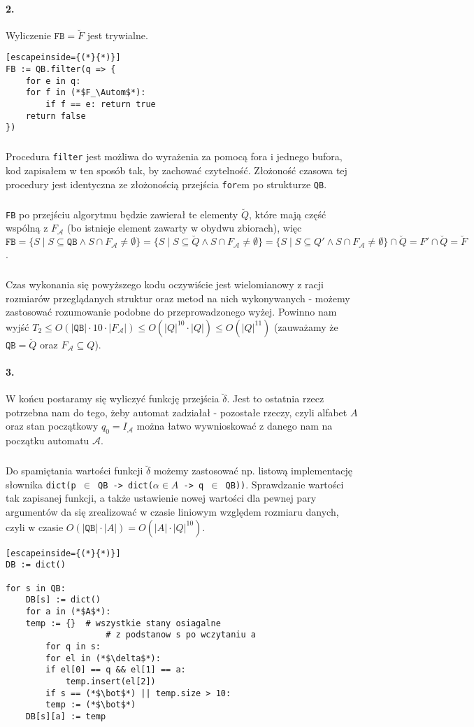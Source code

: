 \documentclass[12pt]{article}
\newcommand*{\Autom}{\mathcal{A}}
\begin{document}
\paragraph{2.}
Wyliczenie $\texttt{FB} = \breve F$ jest trywialne.
\begin{lstlisting}[escapeinside={(*}{*)}]
FB := QB.filter(q => {
    for e in q:
	for f in (*$F_\Autom$*):
	    if f == e: return true
    return false
})
\end{lstlisting}
\subparagraph{}
Procedura \texttt{filter} jest możliwa do wyrażenia za pomocą fora i jednego bufora, kod zapisałem
w ten sposób tak, by zachować czytelność. Złożoność czasowa tej procedury jest identyczna ze
złożonością przejścia \texttt{for}em po strukturze \texttt{QB}.
\subparagraph{}
\texttt{FB} po przejściu algorytmu będzie zawierał te elementy $\breve Q$, które mają część wspólną
z $F_\Autom$ (bo istnieje element zawarty w obydwu zbiorach), więc $\texttt{FB} =
\{S \mid S \subseteq \texttt{QB} \land S \cap F_\Autom \neq \emptyset\} =
\{S \mid S \subseteq \breve Q \land S \cap F_\Autom \neq \emptyset\} =
\{S \mid S \subseteq Q' \land S \cap F_\Autom \neq \emptyset\} \cap \breve Q = F' \cap \breve Q =
\breve F$.
\subparagraph{}
Czas wykonania się powyższego kodu oczywiście jest wielomianowy z racji rozmiarów przeglądanych
struktur oraz metod na nich wykonywanych - możemy zastosować rozumowanie podobne do
przeprowadzonego wyżej.
Powinno nam wyjść $T_2 \leq O(|\texttt{QB}| \cdot 10 \cdot |F_\Autom|) \leq
O(|Q|^{10} \cdot |Q|) \leq O(|Q|^{11})$ (zauważamy że $\texttt{QB} = \breve Q$ oraz
$F_\Autom \subseteq Q$).

\paragraph{3.}
W końcu postaramy się wyliczyć funkcję przejścia $\breve \delta$. Jest to ostatnia rzecz potrzebna
nam do tego, żeby automat zadziałał - pozostałe rzeczy, czyli alfabet $A$ oraz stan początkowy 
$q_0 = I_\Autom$ można łatwo wywnioskować z danego nam na początku automatu $\Autom$.
\subparagraph{}
Do spamiętania wartości funkcji $\breve \delta$ możemy zastosować np. listową implementację
słownika \texttt{dict(p $\in$ QB -> dict($\alpha \in A$ -> q $\in$ QB))}. Sprawdzanie wartości tak
zapisanej funkcji, a także ustawienie nowej wartości dla pewnej pary argumentów da się zrealizować
w czasie liniowym względem rozmiaru danych, czyli w czasie $O(|\texttt{QB}| \cdot |A|) =
O(|A|\cdot|Q|^{10})$.

\begin{lstlisting}[escapeinside={(*}{*)}]
DB := dict()

for s in QB:
    DB[s] := dict()
    for a in (*$A$*):
	temp := {}  # wszystkie stany osiagalne
                    # z podstanow s po wczytaniu a
        for q in s:
	    for el in (*$\delta$*):
		if el[0] == q && el[1] == a:
		    temp.insert(el[2])
        if s == (*$\bot$*) || temp.size > 10:
	    temp := (*$\bot$*)
	DB[s][a] := temp

	    
\end{lstlisting}
\end{document}
